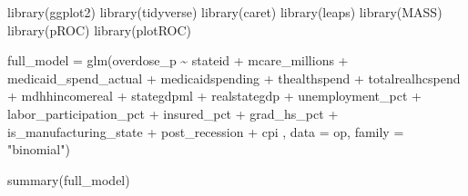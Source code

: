 \documentclass[
]{article}
\newenvironment{Shaded}{\begin{snugshade}}{\end{snugshade}}
\newcommand{\AttributeTok}[1]{\textcolor[rgb]{0.77,0.63,0.00}{#1}}
\newcommand{\FunctionTok}[1]{\textcolor[rgb]{0.00,0.00,0.00}{#1}}
\newcommand{\NormalTok}[1]{#1}
\newcommand{\OtherTok}[1]{\textcolor[rgb]{0.56,0.35,0.01}{#1}}
\newcommand{\SpecialCharTok}[1]{\textcolor[rgb]{0.00,0.00,0.00}{#1}}
\newcommand{\StringTok}[1]{\textcolor[rgb]{0.31,0.60,0.02}{#1}}
\begin{document}
\begin{Shaded}
\begin{Highlighting}[]
\FunctionTok{library}\NormalTok{(ggplot2)}
\FunctionTok{library}\NormalTok{(tidyverse)}
\FunctionTok{library}\NormalTok{(caret)}
\FunctionTok{library}\NormalTok{(leaps)}
\FunctionTok{library}\NormalTok{(MASS)}
\FunctionTok{library}\NormalTok{(pROC)}
\FunctionTok{library}\NormalTok{(plotROC)}

\NormalTok{full\_model }\OtherTok{=} \FunctionTok{glm}\NormalTok{(overdose\_p }\SpecialCharTok{\textasciitilde{}}\NormalTok{ stateid }\SpecialCharTok{+}\NormalTok{ mcare\_millions }\SpecialCharTok{+}\NormalTok{ medicaid\_spend\_actual }\SpecialCharTok{+}\NormalTok{ medicaidspending }\SpecialCharTok{+}\NormalTok{ thealthspend }\SpecialCharTok{+}\NormalTok{ totalrealhcspend }\SpecialCharTok{+}\NormalTok{ mdhhincomereal }\SpecialCharTok{+}\NormalTok{ stategdpml }\SpecialCharTok{+}\NormalTok{ realstategdp }\SpecialCharTok{+}\NormalTok{ unemployment\_pct }\SpecialCharTok{+}\NormalTok{ labor\_participation\_pct }\SpecialCharTok{+}\NormalTok{ insured\_pct }\SpecialCharTok{+}\NormalTok{ grad\_hs\_pct }\SpecialCharTok{+}\NormalTok{ is\_manufacturing\_state }\SpecialCharTok{+}\NormalTok{ post\_recession }\SpecialCharTok{+}\NormalTok{ cpi , }\AttributeTok{data =}\NormalTok{ op, }\AttributeTok{family =} \StringTok{"binomial"}\NormalTok{)}

\FunctionTok{summary}\NormalTok{(full\_model)}
\end{Highlighting}
\end{Shaded}
\end{document}
